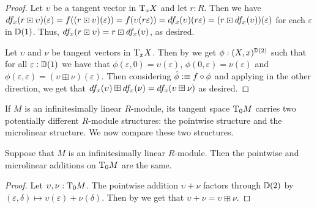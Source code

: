 \begin{proof}
  Let $\upsilon$ be a tangent vector in $\tangent{X}{x}$ and let $r : R$.
  Then we have $\der{f}{x}(r\boxdot\upsilon)(\varepsilon) = f((r\boxdot\upsilon)(\varepsilon)) = f(\upsilon(r\varepsilon)) = \der{f}{x}(\upsilon)(r\varepsilon) = (r \boxdot \der{f}{x}(\upsilon))(\varepsilon)$ for each $\varepsilon$ in $\D(1)$.
  Thus, $\der{f}{x}(r\boxdot\upsilon) = r \boxdot \der{f}{x}(\upsilon)$, as desired.

  Let $\upsilon$ and $\nu$ be tangent vectors in $\tangent{X}{x}$.
  Then by  we get $\phi:(X,x)^{\D(2)}$ such that for all $\varepsilon:\D(1)$ we have that $\phi(\varepsilon,0) = \upsilon(\varepsilon)$, $\phi(0,\varepsilon)=\nu(\varepsilon)$ and $\phi(\varepsilon,\varepsilon)=(\upsilon\boxplus\nu)(\varepsilon)$. Then considering $\hat{\phi} \defeq f\circ\phi$ and applying  in the other direction, we get that $\der{f}{x}(\upsilon) \boxplus \der{f}{x}(\nu) = \der{f}{x}(\upsilon \boxplus \nu)$ as desired.
\end{proof}

If $M$ is an infinitesimally linear $R$-module, its tangent space $\tangent{M}{0}$ carries two potentially different $R$-module structures: the pointwise structure and the microlinear structure. We now compare these two structures.

\begin{theorem}\label{thm:tangent-ptw-micro-add}
  Suppose that $M$ is an infinitesimally linear $R$-module.
  Then the pointwise and microlinear additions on $\tangent{M}{0}$ are the same.
\end{theorem}

\begin{proof}
  Let $\upsilon,\nu : \tangent{M}{0}$.
  The pointwise addition $\upsilon + \nu$ factors through $\D(2)$ by $(\varepsilon,\delta) \mapsto \upsilon(\varepsilon) + \nu(\delta)$.
  Then by  we get that $\upsilon + \nu = \upsilon \boxplus \nu$.
\end{proof}

